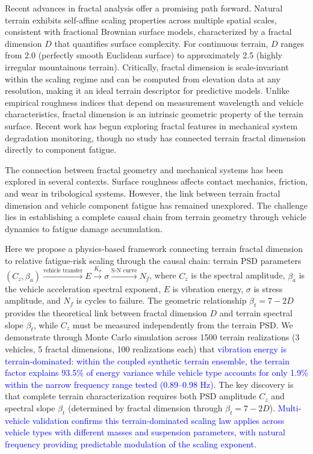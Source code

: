 \documentclass[11pt]{article}
\begin{document}
Recent advances in fractal analysis offer a promising path forward. Natural terrain exhibits self-affine scaling properties across multiple spatial scales\cite{Mandelbrot1982,Sayles1978,Persson2005}, consistent with fractional Brownian surface models\cite{MandelbrotVanNess1968,Mandelbrot1982}, characterized by a fractal dimension $D$ that quantifies surface complexity. For continuous terrain, $D$ ranges from 2.0 (perfectly smooth Euclidean surface) to approximately 2.5 (highly irregular mountainous terrain). Critically, fractal dimension is scale-invariant within the scaling regime and can be computed from elevation data at any resolution, making it an ideal terrain descriptor for predictive models. Unlike empirical roughness indices that depend on measurement wavelength and vehicle characteristics, fractal dimension is an intrinsic geometric property of the terrain surface. Recent work has begun exploring fractal features in mechanical system degradation monitoring\cite{KrejcarNamazi2025}, though no study has connected terrain fractal dimension directly to component fatigue.

The connection between fractal geometry and mechanical systems has been explored in several contexts. Surface roughness affects contact mechanics, friction, and wear in tribological systems\cite{Persson2005}. However, the link between terrain fractal dimension and vehicle component fatigue has remained unexplored. The challenge lies in establishing a complete causal chain from terrain geometry through vehicle dynamics to fatigue damage accumulation.

Here we propose a physics-based framework connecting terrain fractal dimension to relative fatigue-risk scaling through the causal chain: terrain PSD parameters $(C_z, \beta_a) \xrightarrow{\text{vehicle transfer}} E \xrightarrow{K_\sigma} \sigma \xrightarrow{\text{S-N curve}} N_f$, where $C_z$ is the spectral amplitude, $\beta_a$ is the vehicle acceleration spectral exponent, $E$ is vibration energy, $\sigma$ is stress amplitude, and $N_f$ is cycles to failure. The geometric relationship $\beta_t = 7-2D$ provides the theoretical link between fractal dimension $D$ and terrain spectral slope $\beta_t$, while $C_z$ must be measured independently from the terrain PSD. We demonstrate through Monte Carlo simulation across 1500 terrain realizations (3 vehicles, 5 fractal dimensions, 100 realizations each) that \textcolor{blue}{vibration energy is terrain-dominated: within the coupled synthetic terrain ensemble, the terrain factor explains 93.5\% of energy variance while vehicle type accounts for only 1.9\% within the narrow frequency range tested (0.89--0.98 Hz).} The key discovery is that complete terrain characterization requires both PSD amplitude $C_z$ and spectral slope $\beta_t$ (determined by fractal dimension through $\beta_t = 7-2D$). \textcolor{blue}{Multi-vehicle validation confirms this terrain-dominated scaling law applies across vehicle types with different masses and suspension parameters, with natural frequency providing predictable modulation of the scaling exponent.}
\end{document}

